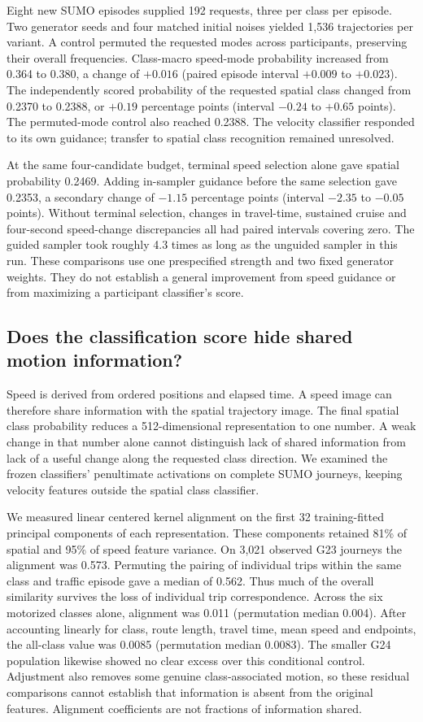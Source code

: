 Eight new SUMO episodes supplied 192 requests, three per class per episode. Two generator seeds and four matched initial noises yielded 1,536 trajectories per variant. A control permuted the requested modes across participants, preserving their overall frequencies. Class-macro speed-mode probability increased from 0.364 to 0.380, a change of $+0.016$ (paired episode interval $+0.009$ to $+0.023$). The independently scored probability of the requested spatial class changed from 0.2370 to 0.2388, or $+0.19$ percentage points (interval $-0.24$ to $+0.65$ points). The permuted-mode control also reached 0.2388. The velocity classifier responded to its own guidance; transfer to spatial class recognition remained unresolved.

At the same four-candidate budget, terminal speed selection alone gave spatial probability 0.2469. Adding in-sampler guidance before the same selection gave 0.2353, a secondary change of $-1.15$ percentage points (interval $-2.35$ to $-0.05$ points). Without terminal selection, changes in travel-time, sustained cruise and four-second speed-change discrepancies all had paired intervals covering zero. The guided sampler took roughly 4.3 times as long as the unguided sampler in this run. These comparisons use one prespecified strength and two fixed generator weights. They do not establish a general improvement from speed guidance or from maximizing a participant classifier's score.

\subsection{Does the classification score hide shared motion information?}
Speed is derived from ordered positions and elapsed time. A speed image can therefore share information with the spatial trajectory image. The final spatial class probability reduces a 512-dimensional representation to one number. A weak change in that number alone cannot distinguish lack of shared information from lack of a useful change along the requested class direction. We examined the frozen classifiers' penultimate activations on complete SUMO journeys, keeping velocity features outside the spatial class classifier.

We measured linear centered kernel alignment \cite{kornblith2019} on the first 32 training-fitted principal components of each representation. These components retained 81\% of spatial and 95\% of speed feature variance. On 3,021 observed G23 journeys the alignment was 0.573. Permuting the pairing of individual trips within the same class and traffic episode gave a median of 0.562. Thus much of the overall similarity survives the loss of individual trip correspondence. Across the six motorized classes alone, alignment was 0.011 (permutation median 0.004). After accounting linearly for class, route length, travel time, mean speed and endpoints, the all-class value was 0.0085 (permutation median 0.0083). The smaller G24 population likewise showed no clear excess over this conditional control. Adjustment also removes some genuine class-associated motion, so these residual comparisons cannot establish that information is absent from the original features. Alignment coefficients are not fractions of information shared.

